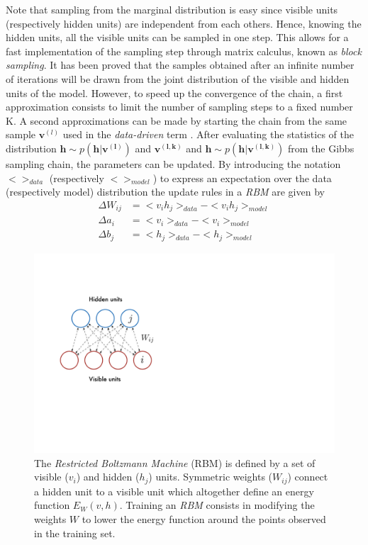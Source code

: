 \documentclass{article}
\begin{document}
Note that sampling from the marginal distribution is easy since visible units (respectively hidden units) are independent from each others. Hence, knowing the hidden units, all the visible units can be sampled in one step. This allows for a fast implementation of the sampling step through matrix calculus, known as \textit{block sampling}.
It has been proved \cite{bengio2009learning} that the samples obtained after an infinite number of iterations will be drawn from the joint distribution of the visible and hidden units of the model. However, to speed up the convergence of the chain, a first approximation consists to limit the number of sampling steps to a fixed number K.
A second approximations can be made by starting the chain from the same sample $\bm{v}^{(l)}$ used in the \textit{data-driven} term \cite{hinton2010practical}. After evaluating the statistics of the distribution $\bm{h} \sim p(\bm{h}|\bm{v^{(l)}})$ and $\bm{v^{(l,k)}}$ and $\bm{h}\sim p(\bm{h}|\bm{v^{(l,k)}})$ from the Gibbs sampling chain, the parameters can be updated. By introducing the notation $<>_{data}$ (respectively $<>_{model}$) to express an expectation over the data (respectively model) distribution the update rules in a \textit{RBM} are given by
\begin{align}
\Delta W_{ij} &= <v_{i}h_{j} >_{data} - <v_{i}h_{j} >_{model}\\
\Delta a_{i} &= <v_{i}>_{data} - <v_{i}>_{model}\\
\Delta b_{j} &= <h_{j} >_{data} - <h_{j} >_{model}
\end{align}
\begin{figure}[h]
\centering
\includegraphics[scale=0.6]{RBM}
\caption{The \textit{Restricted Boltzmann Machine} (RBM) is defined by a set of visible ($v_{i}$) and hidden ($h_{j}$) units.  Symmetric weights ($W_{ij}$) connect a hidden unit to a visible unit which altogether define an energy function $E_{W}(v,h)$. Training an \textit{RBM} consists in modifying the weights $W$ to lower the energy function around the points observed in the training set.}
\label{fig:RBM}
\end{figure}
\end{document}
